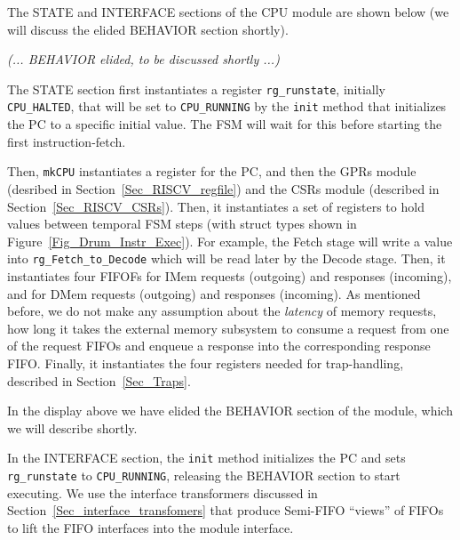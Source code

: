 \label{Sec_Drum_CPU_module}


The STATE and INTERFACE sections of the {\DRUM} CPU module are shown
below (we will discuss the elided BEHAVIOR section shortly).


\hm \emph{(... BEHAVIOR elided, to be discussed shortly ...)}


The STATE section first instantiates a register \verb|rg_runstate|,
initially \verb|CPU_HALTED|, that will be set to \verb|CPU_RUNNING| by
the \verb|init| method that initializes the PC to a specific initial
value.  The FSM will wait for this before starting the first
instruction-fetch.

Then, \verb|mkCPU| instantiates a register for the PC, and then the
GPRs module (desribed in Section~\ref{Sec_RISCV_regfile}) and the CSRs
module (described in Section~\ref{Sec_RISCV_CSRs}).  Then, it
instantiates a set of registers to hold values between temporal FSM
steps (with struct types shown in Figure~\ref{Fig_Drum_Instr_Exec}).
For example, the Fetch stage will write a value into
\verb|rg_Fetch_to_Decode| which will be read later by the Decode
stage.  Then, it instantiates four FIFOFs for IMem requests (outgoing)
and responses (incoming), and for DMem requests (outgoing) and
responses (incoming). As mentioned before, we do not make any
assumption about the \emph{latency} of memory requests, {\ie} how long
it takes the external memory subsystem to consume a request from one
of the request FIFOs and enqueue a response into the corresponding
response FIFO.  Finally, it instantiates the four registers needed for
trap-handling, described in Section~\ref{Sec_Traps}.

In the display above we have elided the BEHAVIOR section of the
module, which we will describe shortly.

In the INTERFACE section, the \verb|init| method initializes the PC
and sets \verb|rg_runstate| to \verb|CPU_RUNNING|, releasing the
BEHAVIOR section to start executing.  We use the interface
transformers discussed in Section~\ref{Sec_interface_transfomers} that
produce Semi-FIFO ``views'' of FIFOs to lift the FIFO interfaces into
the module interface.


